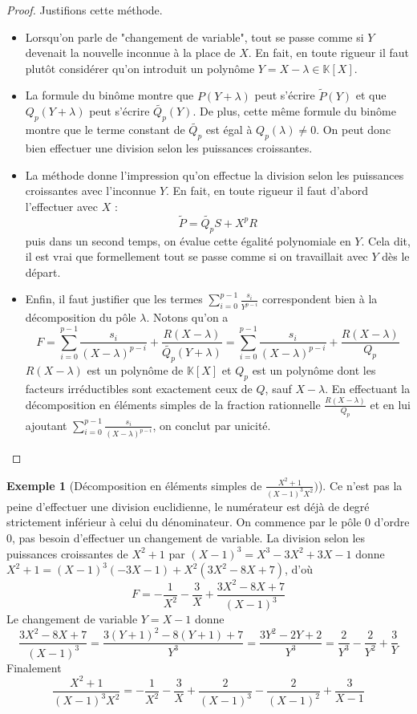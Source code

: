\documentclass[french]{book}
\theoremstyle{plain}
\theoremstyle{definition}
\newtheorem{exa}{Exemple}[chapter]
\theoremstyle{remark}
\begin{document}
\begin{proof}
	Justifions cette méthode.
\begin{itemize}
	\item Lorsqu'on parle de "changement de variable", tout se passe comme si $Y$ devenait la
	nouvelle inconnue à la place de $X$. En fait, en toute rigueur il faut plutôt considérer qu'on introduit un polynôme $Y=X-\lambda\in\mathbb{K}[X]$.
	\item La formule du binôme montre que $P(Y+\lambda)$ peut s'écrire $\tilde{P}(Y)$ et que $Q_{p}(Y+\lambda)$ peut s'écrire $\tilde{Q_{p}}(Y)$. De plus, cette même formule du binôme montre que le terme constant de $\tilde{Q_{p}}$ est égal à $Q_{p}(\lambda)\ne0$. On peut donc bien effectuer une division selon les puissances croissantes.
	\item La méthode donne l'impression qu'on effectue la division selon les puissances croissantes avec l'inconnue $Y$. En fait, en toute rigueur il faut d'abord l'effectuer avec $X$ : $$\tilde{P}=\tilde{Q_{p}}S+X^{p}R$$ puis dans un second temps, on évalue cette égalité polynomiale en $Y$. Cela dit, il est vrai que formellement tout se passe comme si on travaillait avec $Y$ dès le départ.
	\item Enfin, il faut justifier que les termes $\displaystyle\sum_{i=0}^{p-1}\frac{s_{i}}{Y^{p-i}}$ correspondent bien à la décomposition du pôle $\lambda$. Notons qu'on a $$F=\sum_{i=0}^{p-1}\frac{s_{i}}{(X-\lambda)^{p-i}}+\frac{R(X-\lambda)}{\tilde{Q_{p}}(Y+\lambda)}=\sum_{i=0}^{p-1}\frac{s_{i}}{(X-\lambda)^{p-i}}+\frac{R(X-\lambda)}{Q_{p}}$$ $R(X-\lambda)$ est un polynôme de $\mathbb{K}[X]$ et $Q_{p}$ est un polynôme dont les facteurs irréductibles sont exactement ceux de $Q$, sauf $X-\lambda$. En effectuant la décomposition en éléments simples de la fraction rationnelle $\displaystyle\frac{R(X-\lambda)}{Q_{p}}$ et en lui ajoutant $\displaystyle\sum_{i=0}^{p-1}\frac{s_{i}}{(X-\lambda)^{p-i}}$, on conclut par unicité.
\end{itemize}
\end{proof}
\begin{exa}[Décomposition en éléments simples de $\displaystyle\frac{X^{2}+1}{(X-1)^{3}X^{2}})$]
	Ce n'est pas la peine d'effectuer une division euclidienne, le numérateur est déjà de degré strictement inférieur à celui du dénominateur. On commence par le pôle $0$ d'ordre $0$, pas besoin d'effectuer un changement de variable. La division selon les puissances croissantes de $X^2+1$ par $(X-1)^3=X^3-3X^2+3X-1$ donne $X^2+1=(X-1)^3(-3X-1)+X^2(3X^2-8X+7)$, d'où $$F=-\frac{1}{X^2}-\frac{3}{X}+\frac{3X^2-8X+7}{(X-1)^3}$$ Le changement de variable $Y=X-1$ donne $$\frac{3X^2-8X+7}{(X-1)^3}=\frac{3(Y+1)^2-8(Y+1)+7}{Y^3}=\frac{3Y^2-2Y+2}{Y^3}=\frac{2}{Y^3}-\frac{2}{Y^2}+\frac{3}{Y}$$ Finalement $$\frac{X^2+1}{(X-1)^3X^2}=-\frac{1}{X^2}-\frac{3}{X}+\frac{2}{(X-1)^3}-\frac{2}{(X-1)^2}+\frac{3}{X-1}$$
\end{exa}
\end{document}
